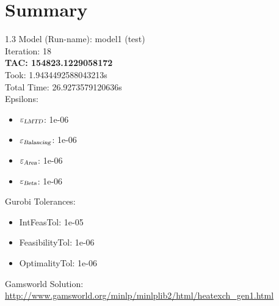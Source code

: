 \documentclass{article}%
\begin{document}
%
\normalsize%
\section{Summary}%
\thispagestyle{plain}%
\begin{spacing}{1.3}%
\Large%
Model (Run-name): model1 (test)\\%
Iteration: 18\\%
\textbf{TAC: 154823.1229058172}\\%
Took: 1.9434492588043213s\\%
Total Time: 26.9273579120636s\\%
Epsilons:%
\begin{itemize}%
	\item $\varepsilon_{\textsl{LMTD}}$: 1e-06%
	\item $\varepsilon_{\textsl{Balancing}}$: 1e-06%
	\item $\varepsilon_{\textsl{Area}}$: 1e-06%
	\item $\varepsilon_{\textsl{Beta}}$: 1e-06%
\end{itemize}%
Gurobi Tolerances:%
\begin{itemize}%
	\item IntFeasTol: 1e-05%
	\item FeasibilityTol: 1e-06%
	\item OptimalityTol: 1e-06%
\end{itemize}%
\end{spacing}%
\normalsize%
Gamsworld Solution: \url{http://www.gamsworld.org/minlp/minlplib2/html/heatexch_gen1.html}%
%
\clearpage%
\end{document}
